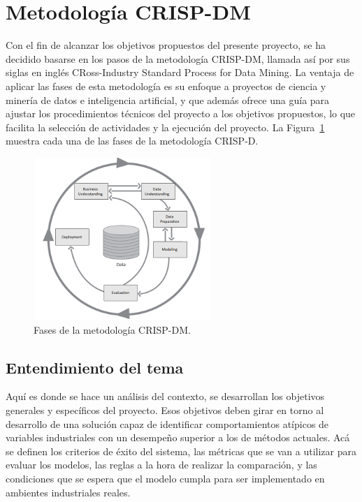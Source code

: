 \documentclass[11pt,a4paper,spanish]{book}
\numberwithin{equation}{chapter}
\numberwithin{figure}{chapter}
\begin{document}
\section{Metodología CRISP-DM}

Con el fin de alcanzar los objetivos propuestos del presente proyecto, se ha decidido 
basarse en los pasos de la metodología  CRISP-DM, llamada así por sus siglas en inglés 
CRoss-Industry Standard Process for Data Mining. La ventaja de aplicar las fases de esta
metodología es su enfoque a proyectos de ciencia y minería de datos e inteligencia 
artificial, y que además ofrece una guía para ajustar los procedimientos técnicos del 
proyecto a los objetivos propuestos, lo que facilita la selección de actividades y 
la ejecución del proyecto. La Figura~\ref{fig:figCrispdm} muestra cada una de las 
fases de la metodología 
CRISP-D.


\begin{figure}[h]
    \centering
    \includegraphics[width=0.6\textwidth]{media/crisp-dm.png}
    \caption{Fases de la metodología {CRISP-DM}.  \protect\cite{chapman2000crisp} }
    \label{fig:figCrispdm}
\end{figure}



\subsection{Entendimiento del tema}

Aquí es donde se hace un análisis del contexto, se desarrollan los objetivos generales 
y específicos del proyecto. Esos objetivos deben girar en torno al desarrollo de una 
solución capaz de identificar comportamientos atípicos de variables industriales con un 
desempeño superior a los de métodos actuales. Acá se definen los criterios de éxito del
sistema, las métricas que se van a utilizar para evaluar los modelos, las reglas a la 
hora de realizar la comparación, y las condiciones que se espera que el modelo cumpla 
para ser implementado en ambientes industriales reales. 
\end{document}
